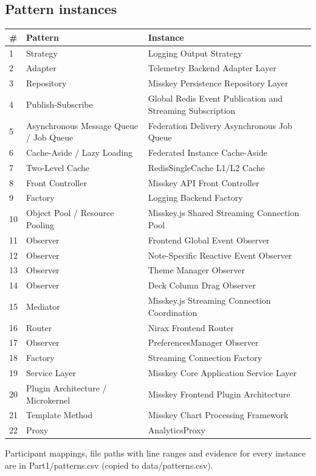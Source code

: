 \documentclass[11pt,a4paper]{article}
\begin{document}
\subsection{Pattern instances}
{\small\begin{tabularx}{\linewidth}{llX}\toprule
\# & Pattern & Instance\\\midrule
1 & Strategy & Logging Output Strategy \\
2 & Adapter & Telemetry Backend Adapter Layer \\
3 & Repository & Misskey Persistence Repository Layer \\
4 & Publish-Subscribe & Global Redis Event Publication and Streaming Subscription \\
5 & Asynchronous Message Queue / Job Queue & Federation Delivery Asynchronous Job Queue \\
6 & Cache-Aside / Lazy Loading & Federated Instance Cache-Aside \\
7 & Two-Level Cache & RedisSingleCache L1/L2 Cache \\
8 & Front Controller & Misskey API Front Controller \\
9 & Factory & Logging Backend Factory \\
10 & Object Pool / Resource Pooling & Misskey.js Shared Streaming Connection Pool \\
11 & Observer & Frontend Global Event Observer \\
12 & Observer & Note-Specific Reactive Event Observer \\
13 & Observer & Theme Manager Observer \\
14 & Observer & Deck Column Drag Observer \\
15 & Mediator & Misskey.js Streaming Connection Coordination \\
16 & Router & Nirax Frontend Router \\
17 & Observer & PreferencesManager Observer \\
18 & Factory & Streaming Connection Factory \\
19 & Service Layer & Misskey Core Application Service Layer \\
20 & Plugin Architecture / Microkernel & Misskey Frontend Plugin Architecture \\
21 & Template Method & Misskey Chart Processing Framework \\
22 & Proxy & AnalyticsProxy\\
\bottomrule\end{tabularx}}

Participant mappings, file paths with line ranges and evidence for every instance are in Part1/patterns.csv (copied to data/patterns.csv).
\end{document}
